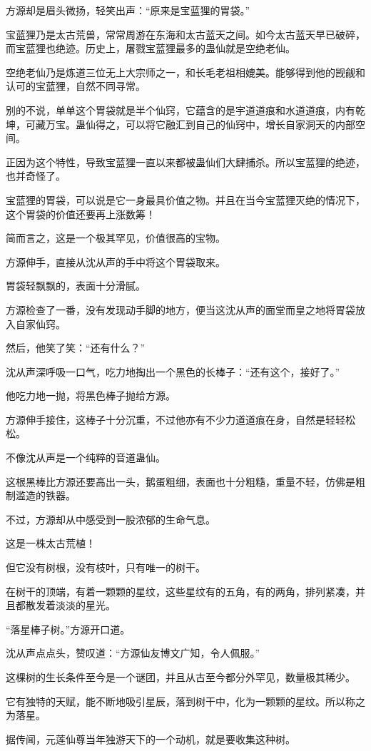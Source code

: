 \begin{this_body}
方源却是眉头微扬，轻笑出声：“原来是宝蓝狸的胃袋。”

宝蓝狸乃是太古荒兽，常常周游在东海和太古蓝天之间。如今太古蓝天早已破碎，而宝蓝狸也绝迹。历史上，屠戮宝蓝狸最多的蛊仙就是空绝老仙。

空绝老仙乃是炼道三位无上大宗师之一，和长毛老祖相媲美。能够得到他的觊觎和认可的宝蓝狸，自然不同寻常。

别的不说，单单这个胃袋就是半个仙窍，它蕴含的是宇道道痕和水道道痕，内有乾坤，可藏万宝。蛊仙得之，可以将它融汇到自己的仙窍中，增长自家洞天的内部空间。

正因为这个特性，导致宝蓝狸一直以来都被蛊仙们大肆捕杀。所以宝蓝狸的绝迹，也并奇怪了。

宝蓝狸的胃袋，可以说是它一身最具价值之物。并且在当今宝蓝狸灭绝的情况下，这个胃袋的价值还要再上涨数筹！

简而言之，这是一个极其罕见，价值很高的宝物。

方源伸手，直接从沈从声的手中将这个胃袋取来。

胃袋轻飘飘的，表面十分滑腻。

方源检查了一番，没有发现动手脚的地方，便当这沈从声的面堂而皇之地将胃袋放入自家仙窍。

然后，他笑了笑：“还有什么？”

沈从声深呼吸一口气，吃力地掏出一个黑色的长棒子：“还有这个，接好了。”

他吃力地一抛，将黑色棒子抛给方源。

方源伸手接住，这棒子十分沉重，不过他亦有不少力道道痕在身，自然是轻轻松松。

不像沈从声是一个纯粹的音道蛊仙。

这根黑棒比方源还要高出一头，鹅蛋粗细，表面也十分粗糙，重量不轻，仿佛是粗制滥造的铁器。

不过，方源却从中感受到一股浓郁的生命气息。

这是一株太古荒植！

但它没有树根，没有枝叶，只有唯一的树干。

在树干的顶端，有着一颗颗的星纹，这些星纹有的五角，有的两角，排列紧凑，并且都散发着淡淡的星光。

“落星棒子树。”方源开口道。

沈从声点点头，赞叹道：“方源仙友博文广知，令人佩服。”

这棵树的生长条件至今是一个谜团，并且从古至今都分外罕见，数量极其稀少。

它有独特的天赋，能不断地吸引星辰，落到树干中，化为一颗颗的星纹。所以称之为落星。

据传闻，元莲仙尊当年独游天下的一个动机，就是要收集这种树。


\end{this_body}
